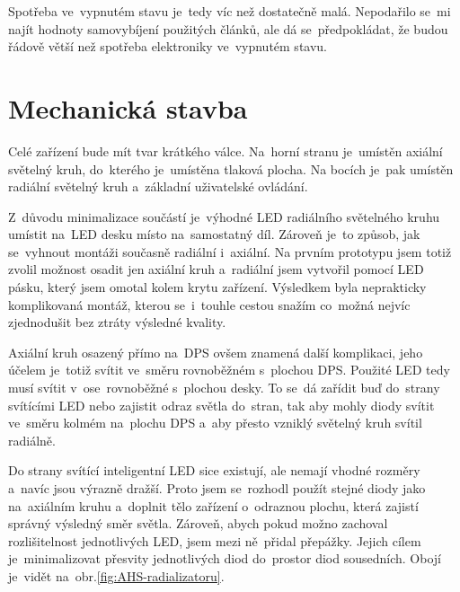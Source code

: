 Spotřeba ve~vypnutém stavu je~tedy víc než dostatečně malá.
Nepodařilo se~mi najít hodnoty samovybíjení použitých článků, ale dá se~předpokládat, že budou řádově větší než spotřeba elektroniky ve~vypnutém stavu.

\section{Mechanická stavba}
Celé zařízení bude mít tvar krátkého válce.
Na~horní stranu je~umístěn axiální světelný kruh, do~kterého je~umístěna tlaková plocha.
Na bocích je~pak umístěn radiální světelný kruh a~základní uživatelské ovládání.

Z~důvodu minimalizace součástí je~výhodné LED radiálního světelného kruhu umístit na~LED desku místo na~samostatný díl.
Zároveň je~to způsob, jak se~vyhnout montáži současně radiální i~axiální.
Na prvním prototypu jsem totiž zvolil možnost osadit jen axiální kruh a~radiální jsem vytvořil pomocí LED pásku, který jsem omotal kolem krytu zařízení.
Výsledkem byla neprakticky komplikovaná montáž, kterou se~i~touhle cestou snažím co~možná nejvíc zjednodušit bez ztráty výsledné kvality.

Axiální kruh osazený přímo na~DPS ovšem znamená další komplikaci, jeho účelem je~totiž svítit ve~směru rovnoběžném s~plochou DPS.
Použité LED tedy musí svítit v~ose~rovnoběžné s~plochou desky.
To se~dá zařídit buď do~strany svítícími LED nebo zajistit odraz světla do~stran, tak aby mohly diody svítit ve~směru kolmém na~plochu DPS a~aby přesto vzniklý světelný kruh svítil radiálně.

Do strany svítící inteligentní LED sice existují, ale nemají vhodné rozměry a~navíc jsou výrazně dražší.
Proto jsem se~rozhodl použít stejné diody jako na~axiálním kruhu a~doplnit tělo zařízení o~odraznou plochu, která zajistí správný výsledný směr světla.
Zároveň, abych pokud možno zachoval rozlišitelnost jednotlivých LED, jsem mezi ně~přidal přepážky.
Jejich cílem je~minimalizovat přesvity jednotlivých diod do~prostor diod sousedních.
Obojí je~vidět na~obr.\ref{fig:AHS-radializatoru}.

